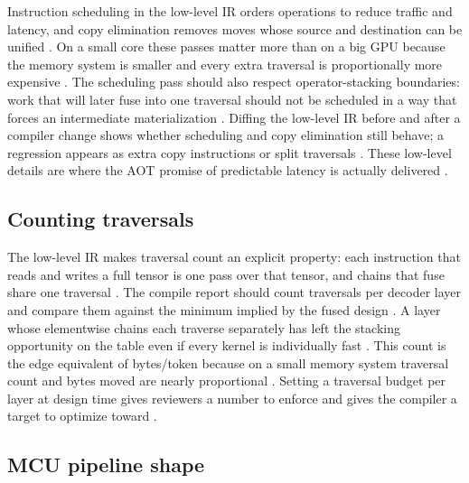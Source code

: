 Instruction scheduling in the low-level IR orders operations to reduce traffic and latency, and copy elimination removes moves whose source and destination can be unified \citep{rotem2018glow,memoryfloor2026}. On a small core these passes matter more than on a big GPU because the memory system is smaller and every extra traversal is proportionally more expensive \citep{dlbook,taxbreak2026}. The scheduling pass should also respect operator-stacking boundaries: work that will later fuse into one traversal should not be scheduled in a way that forces an intermediate materialization \citep{rotem2018glow,patel2025llminference}. Diffing the low-level IR before and after a compiler change shows whether scheduling and copy elimination still behave; a regression appears as extra copy instructions or split traversals \citep{memoryfloor2026,chen2020compilerbasedhardw}. These low-level details are where the AOT promise of predictable latency is actually delivered \citep{rotem2018glow,taxbreak2026}.

\subsection{Counting traversals}

The low-level IR makes traversal count an explicit property: each instruction that reads and writes a full tensor is one pass over that tensor, and chains that fuse share one traversal \citep{rotem2018glow,memoryfloor2026}. The compile report should count traversals per decoder layer and compare them against the minimum implied by the fused design \citep{chen2020compilerbasedhardw,taxbreak2026}. A layer whose elementwise chains each traverse separately has left the stacking opportunity on the table even if every kernel is individually fast \citep{memoryfloor2026,rotem2018glow}. This count is the edge equivalent of bytes/token because on a small memory system traversal count and bytes moved are nearly proportional \citep{dlbook,taxbreak2026}. Setting a traversal budget per layer at design time gives reviewers a number to enforce and gives the compiler a target to optimize toward \citep{patel2025llminference,memoryfloor2026}.

\subsection{MCU pipeline shape}

